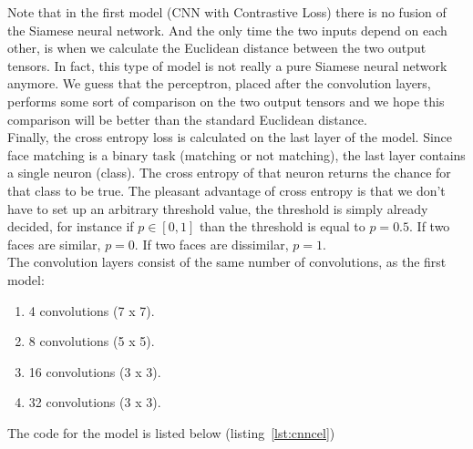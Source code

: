  Note that in the first model (CNN with Contrastive Loss) there is no fusion of the Siamese neural network. And the only time the two inputs depend on each other, is when we calculate the Euclidean distance between the two output tensors. In fact, this type of model is not really a pure Siamese neural network anymore. We guess that the perceptron, placed after the convolution layers, performs some sort of comparison on the two output tensors and we hope this comparison will be better than the standard Euclidean distance.\\

 Finally, the cross entropy loss is calculated on the last layer of the model. Since face matching is a binary task (matching or not matching), the last layer contains a single neuron (class). The cross entropy of that neuron returns the chance for that class to be true. The pleasant advantage of cross entropy is that we don't have to set up an arbitrary threshold value, the threshold is simply already decided, for instance if $p \in [0,1]$ than the threshold is equal to $p = 0.5$. If two faces are similar, $p=0$. If two faces are dissimilar, $p=1$.\\

 The convolution layers consist of the same number of convolutions, as the first model:

 \begin{enumerate}
   \item 4 convolutions (7 x 7).
   \item 8 convolutions (5 x 5).
   \item 16 convolutions (3 x 3).
   \item 32 convolutions (3 x 3).
 \end{enumerate}

 The code for the model is listed below (listing~\ref{lst:cnncel})

